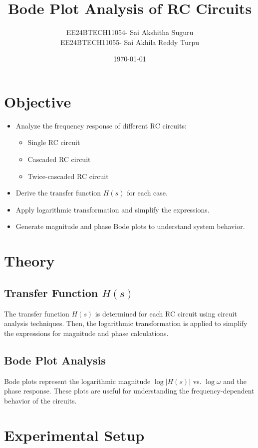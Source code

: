 \documentclass[a4paper,12pt]{article}
\title{\textbf{Bode Plot Analysis of RC Circuits}}
\author{EE24BTECH11054- Sai Akshitha Suguru\\EE24BTECH11055- Sai Akhila Reddy Turpu}
\date{\today}
\begin{document}
\maketitle

\section{Objective}
\begin{itemize}
    \item Analyze the frequency response of different RC circuits:
    \begin{itemize}
        \item Single RC circuit
        \item Cascaded RC circuit
        \item Twice-cascaded RC circuit
    \end{itemize}
    \item Derive the transfer function $H(s)$ for each case.
    \item Apply logarithmic transformation and simplify the expressions.
    \item Generate magnitude and phase Bode plots to understand system behavior.
\end{itemize}

\section{Theory}

\subsection{Transfer Function $H(s)$}
The transfer function $H(s)$ is determined for each RC circuit using circuit analysis techniques. Then, the logarithmic transformation is applied to simplify the expressions for magnitude and phase calculations.

\subsection{Bode Plot Analysis}
Bode plots represent the logarithmic magnitude $\log |H(s)|$ vs. $\log \omega$ and the phase response. These plots are useful for understanding the frequency-dependent behavior of the circuits.

\section{Experimental Setup}
\end{document}
